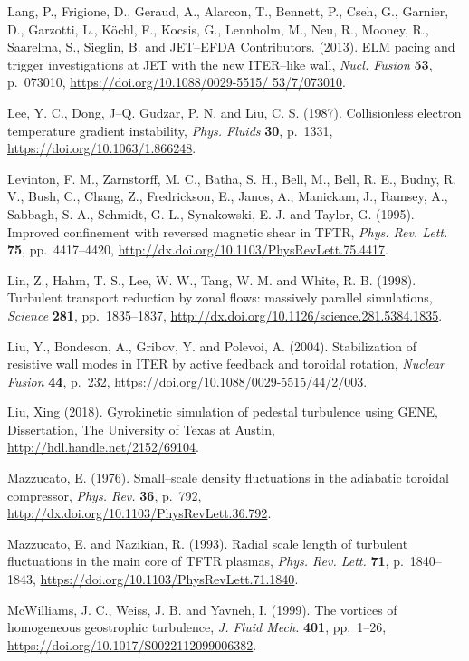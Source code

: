\documentclass[a4paper,openany,12pt]{book}
\begin{document}
{\begin{thebibliography}{100}
\bibitem{}
Lang, P., Frigione, D., Geraud, A., Alarcon, T., Bennett, P., Cseh, G., Garnier, D., Garzotti, L., K\"ochl, F., Kocsis, G., Lennholm, M., Neu, R., Mooney, R., Saarelma, S., Sieglin, B. and JET--EFDA Contributors. (2013). ELM pacing and trigger investigations at JET with the new ITER--like wall, \emph{Nucl. Fusion} \textbf{53}, p.~073010, \url{https://doi.org/10.1088/0029-5515/ 53/7/073010}.

\bibitem{}
Lee, Y. C., Dong, J--Q. Gudzar, P. N. and Liu, C. S. (1987). Collisionless electron temperature gradient instability, {\em Phys. Fluids} \textbf{30}, p.~1331, \url{https://doi.org/10.1063/1.866248}.

\bibitem{}
Levinton, F. M., Zarnstorff, M. C., Batha, S. H., Bell, M., Bell, R. E., Budny, R. V., Bush, C., Chang, Z., Fredrickson, E., Janos, A., Manickam, J., Ramsey, A., Sabbagh, S. A., Schmidt, G. L., Synakowski, E. J. and Taylor, G. (1995). Improved confinement with reversed magnetic shear in TFTR, \emph{Phys. Rev. Lett.} \textbf{75}, pp.~4417--4420, 
\url{http://dx.doi.org/10.1103/PhysRevLett.75.4417}.

\bibitem{}
Lin, Z., Hahm, T. S., Lee, W. W., Tang, W. M. and White, R. B. (1998). Turbulent transport reduction by zonal flows: massively parallel simulations, \emph{Science} \textbf{281}, pp.~1835--1837, 
\url{http://dx.doi.org/10.1126/science.281.5384.1835}.

\bibitem{}
Liu, Y., Bondeson, A., Gribov, Y. and Polevoi, A. (2004). Stabilization of resistive wall modes in ITER by active feedback and toroidal rotation, \emph{Nuclear Fusion} \textbf{44}, p.~232, 
\url{https://doi.org/10.1088/0029-5515/44/2/003}.

\bibitem{}
Liu, Xing (2018). Gyrokinetic simulation of pedestal turbulence using GENE, Dissertation, The University of Texas at Austin, \url{http://hdl.handle.net/2152/69104}.

\bibitem{}
Mazzucato, E. (1976). Small--scale density fluctuations in the adiabatic toroidal compressor, \emph{Phys. Rev.} \textbf{36}, p.~792, \url{http://dx.doi.org/10.1103/PhysRevLett.36.792}.

\bibitem{}
Mazzucato, E. and Nazikian, R. (1993). Radial scale length of turbulent fluctuations in the main core of TFTR plasmas, 
\emph{Phys. Rev. Lett.} \textbf{71}, p.~1840--1843, \url{https://doi.org/10.1103/PhysRevLett.71.1840}.

\bibitem{}
 McWilliams, J. C., Weiss, J. B. and Yavneh, I. (1999). The vortices of homogeneous geostrophic turbulence, 
\emph{J. Fluid Mech.} \textbf{401}, pp.~1--26, \url{https://doi.org/10.1017/S0022112099006382}. 


\end{thebibliography}}
\end{document}

